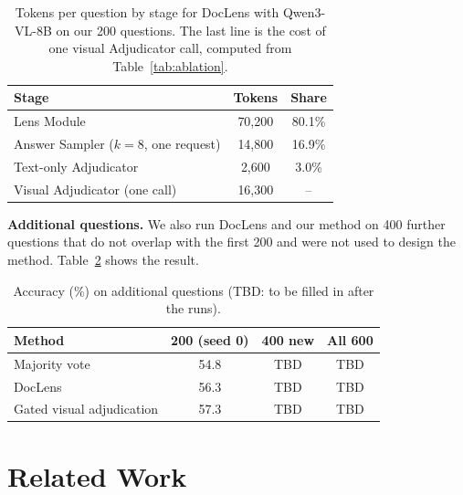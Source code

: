 \begin{table}[t]
\caption{Tokens per question by stage for DocLens with Qwen3-VL-8B on our 200 questions. The last line is the cost of one visual Adjudicator call, computed from Table~\ref{tab:ablation}.}
\label{tab:tokens}
\centering
\footnotesize
\begin{tabular}{@{}lcc@{}}
\toprule
Stage & Tokens & Share \\
\midrule
Lens Module & 70,200 & 80.1\% \\
Answer Sampler ($k=8$, one request) & 14,800 & 16.9\% \\
Text-only Adjudicator & 2,600 & 3.0\% \\
\midrule
Visual Adjudicator (one call) & 16,300 & -- \\
\bottomrule
\end{tabular}
\end{table}

\ifextended
\textbf{Additional questions.} We also run DocLens and our method on 400 further questions that do not overlap with the first 200 and were not used to design the method. Table~\ref{tab:extended} shows the result.

\begin{table}[t]
\caption{Accuracy (\%) on additional questions (TBD: to be filled in after the runs).}
\label{tab:extended}
\centering
\footnotesize
\begin{tabular}{@{}lccc@{}}
\toprule
Method & 200 (seed 0) & 400 new & All 600 \\
\midrule
Majority vote & 54.8 & TBD & TBD \\
DocLens & 56.3 & TBD & TBD \\
Gated visual adjudication & 57.3 & TBD & TBD \\
\bottomrule
\end{tabular}
\end{table}
\fi

\section{Related Work}
\label{sec:related}

